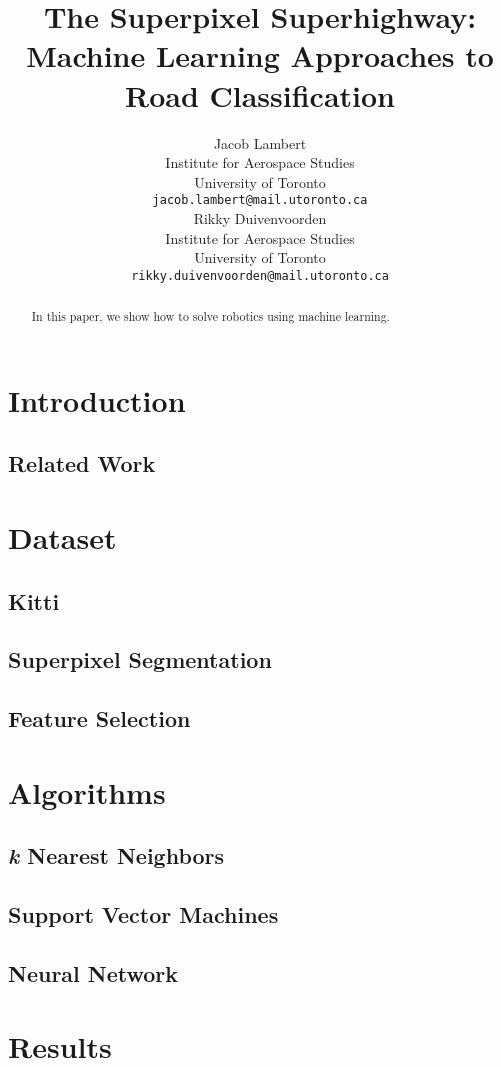 \documentclass{article} %
\title{The Superpixel Superhighway: Machine Learning Approaches to Road Classification}
\author{
Jacob Lambert\\
Institute for Aerospace Studies\\
University of Toronto\\
\texttt{jacob.lambert@mail.utoronto.ca} \\
\And
Rikky Duivenvoorden\\
Institute for Aerospace Studies\\
University of Toronto\\
\texttt{rikky.duivenvoorden@mail.utoronto.ca} \\
}
\begin{document}
\maketitle

\begin{abstract}
In this paper, we show how to solve robotics using machine learning.
\end{abstract}

\section{Introduction}

\subsection{Related Work}

\section{Dataset}
\subsection{Kitti}
\subsection{Superpixel Segmentation}
\subsection{Feature Selection}

\section{Algorithms}
\subsection{\textit{k} Nearest Neighbors}
\subsection{Support Vector Machines}
\subsection{Neural Network}

\section{Results}
\end{document}
